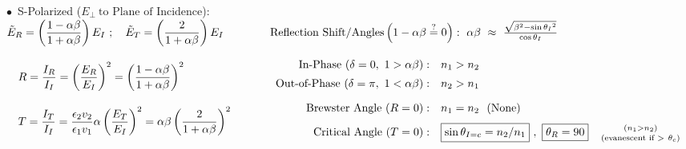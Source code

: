 \documentclass[12pt]{article}
\begin{document}
\vspace{15pt}\noindent
\(\bullet\)\ S-Polarized (\(E_\perp\ \text{to Plane of Incidence}\)):\\[10pt]
\(\begin{aligned}[t]
	&\tilde E_R = \left( \frac{1-\alpha\beta}{1+\alpha\beta} \right) E_I\ ;\ \ \ 
		\tilde E_T = \left( \frac{2}{1+\alpha\beta} \right) E_I \\[10pt]
	&\ \ \ R = \frac{I_R}{I_I} = \left( \frac{E_R}{E_I} \right)^2 
		= \left( \frac{1-\alpha\beta}{1+\alpha\beta} \right)^2 \\[10pt]
	&\ \ \ T = \frac{I_T}{I_I} 
		= \frac{\epsilon_2 v_2}{\epsilon_1 v_1} \alpha \left( \frac{E_T}{E_I} \right)^2 
		= \alpha \beta \left( \frac{2}{1+\alpha\beta} \right)^2
\end{aligned}
\hspace{35pt}
\begin{aligned}[t]
	&\text{Reflection Shift/Angles} \left( 1-\alpha\beta \stackrel{?}{=} 0 \right): \ \alpha\beta 
		\ \approx\ \tfrac{ \sqrt{ \beta^2 - \sin{\theta_I}^2 } }{ \cos{\theta_I} }\\[10pt]
	&\begin{array}{r l}
		\text{In-Phase}\ (\delta = 0,\ 1>\alpha\beta):			& n_1 > n_2\\[5pt]
		\text{Out-of-Phase}\ (\delta = \pi,\ 1<\alpha\beta):	& n_2 > n_1\\[10pt]
		\text{Brewster Angle}\ (R=0):							& n_1=n_2\ \ (\text{None})\\[5pt]
		\text{Critical Angle}\ (T=0):							& \boxed{ \sin{\theta_{I=c}} = n_2/n_1}\ , \ 
			\boxed{ \theta_R = 90 } \hspace{.4cm} \begin{gathered}
				{\scriptstyle(n_1>n_2)}\\[-3pt]
				{\scriptstyle(\text{evanescent if } >\ \theta_c)}
			\end{gathered}
	\end{array}
\end{aligned}\)

\newpage
\end{document}
